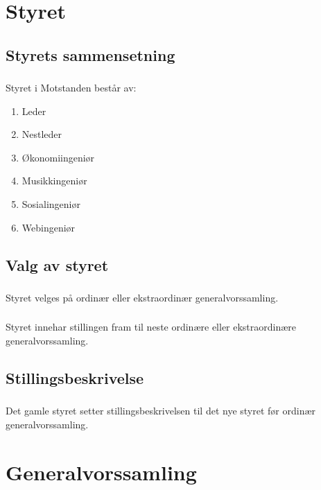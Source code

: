 \documentclass{article}
\newenvironment{statute}[1][]
    {
        \titleformat{\subsubsection}[runin]{\normalfont}{\hspace{1pt}\textit{\S\hspace{5pt}\thesubsubsection}}{0pt}{\rule{4pt}{0pt}}{}
        \subsubsection{}#1
        \begin{minipage}[t]{0.9\linewidth}
    }
    {
        \end{minipage}
        
        \ignorespacesafterend
    }
\begin{document}
    \section{Styret}
        \subsection{Styrets sammensetning}
            \begin{statute}
                Styret i Motstanden består av:
                \begin{enumerate}[font = \bfseries]
                    \item Leder
                    \item Nestleder
                    \item Økonomiingeniør
                    \item Musikkingeniør
                    \item Sosialingeniør
                    \item Webingeniør
                \end{enumerate}
            \end{statute}

        \subsection{Valg av styret}
            \begin{statute}
                Styret velges på ordinær eller ekstraordinær generalvorssamling.
            \end{statute}
            \begin{statute}
                Styret innehar stillingen fram til neste ordinære eller ekstraordinære generalvorssamling.
            \end{statute}
            
        \subsection{Stillingsbeskrivelse}
            \begin{statute}
                Det gamle styret setter stillingsbeskrivelsen til det nye styret før ordinær generalvorssamling.
            \end{statute}
            
    \section{Generalvorssamling}
\end{document}
